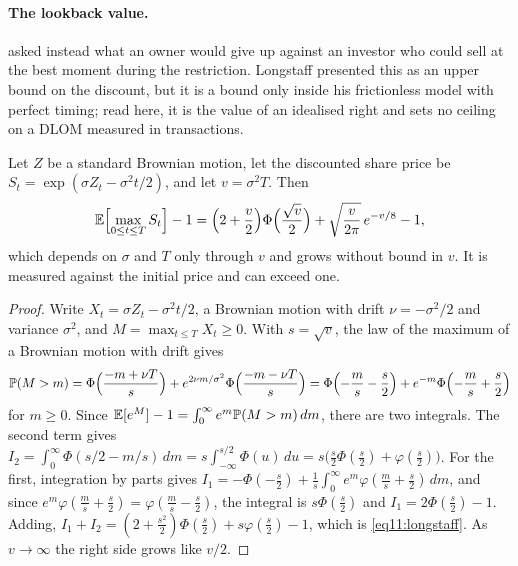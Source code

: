 \begin{chapterrefs}
\paragraph{The lookback value.}
\textcite{longstaff1995} asked instead what an owner would give up against an investor who could sell
at the best moment during the restriction. Longstaff presented this as an upper bound on the discount, but it is a bound only inside his
frictionless model with perfect timing; read here, it is the value of an idealised right and sets no ceiling
on a DLOM measured in transactions.

\begin{proposition}\label{prop11:longstaff}
Let $Z$ be a standard Brownian motion, let the discounted share price be
$S_t=\exp(\sigma Z_t-\sigma^2t/2)$, and let $v=\sigma^2T$. Then
\begin{equation}\label{eq11:longstaff}
  \mathbb{E}\Bigl[\max_{0\le t\le T}S_t\Bigr]-1=\Bigl(2+\frac v2\Bigr)\Phi\Bigl(\frac{\sqrt v}2\Bigr)
  +\sqrt{\frac v{2\pi}}\,e^{-v/8}-1,
\end{equation}
which depends on $\sigma$ and $T$ only through $v$ and grows without bound in $v$. It is measured against
the initial price and can exceed one.
\end{proposition}

\begin{proof}
Write $X_t=\sigma Z_t-\sigma^2t/2$, a Brownian motion with drift $\nu=-\sigma^2/2$ and variance $\sigma^2$,
and $M=\max_{t\le T}X_t\ge0$. With $s=\sqrt v$, the law of the maximum of a Brownian motion with drift gives
\[
  \mathbb P(M>m)=\Phi\Bigl(\frac{-m+\nu T}{s}\Bigr)+e^{2\nu m/\sigma^2}\Phi\Bigl(\frac{-m-\nu T}{s}\Bigr)
  =\Phi\Bigl(-\frac ms-\frac s2\Bigr)+e^{-m}\Phi\Bigl(-\frac ms+\frac s2\Bigr)
\]
for $m\ge0$. Since $\mathbb{E}[e^M]-1=\int_0^\infty e^m\mathbb P(M>m)\,dm$, there are two integrals. The second term
gives $I_2=\int_0^\infty \Phi(s/2-m/s)\,dm=s\int_{-\infty}^{s/2}\Phi(u)\,du=s\bigl(\tfrac s2\Phi(\tfrac s2)+\varphi(\tfrac s2)\bigr)$.
For the first, integration by parts gives
$I_1=-\Phi(-\tfrac s2)+\tfrac1s\int_0^\infty e^m\varphi(\tfrac ms+\tfrac s2)\,dm$, and since
$e^m\varphi(\tfrac ms+\tfrac s2)=\varphi(\tfrac ms-\tfrac s2)$, the integral is $s\Phi(\tfrac s2)$ and
$I_1=2\Phi(\tfrac s2)-1$. Adding, $I_1+I_2=(2+\tfrac{s^2}2)\Phi(\tfrac s2)+s\varphi(\tfrac s2)-1$, which is
\cref{eq11:longstaff}. As $v\to\infty$ the right side grows like $v/2$.
\end{proof}


\end{chapterrefs}
